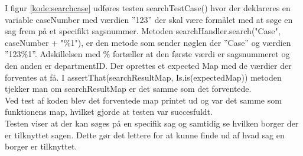 I figur \ref{kode:searchcase} udføres testen searchTestCase() hvor der deklareres en variable caseNumber med værdien ”123” der skal være formålet med at søge en sag frem på et specifikt sagsnummer. Metoden searchHandler.search("Case", caseNumber + "\%1"), er den metode som sender nøglen der ”Case” og værdien ”123\%1”. Adskillelsen med \% fortæller at den første værdi er sagsnummeret og den anden er departmentID. Der oprettes et expected Map med de værdier der forventes at få. I assertThat(searchResultMap, Is.is(expectedMap)) metoden tjekker man om searchResultMap er det samme som det forventede.\\
Ved test af koden blev det forventede map printet ud og var det samme som funktionens map, hvilket gjorde at testen var succesfuldt. \\
Testen viser at der kan søges på en specifik sag og samtidig se hvilken borger der er tilknyttet sagen. Dette gør det lettere for at kunne finde ud af hvad sag en borger er tilknyttet.  \\

